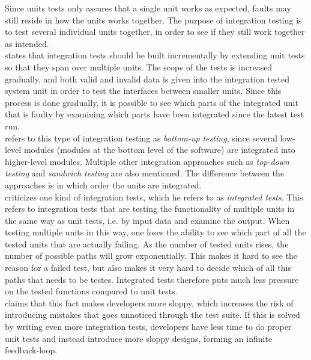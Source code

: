 Since units tests only assures that a single unit works as expected,
faults may still reside in how the units works together. The purpose of
integration testing is to test several individual units together, in
order to see if they still work together as intended.\\

\citet{book:adp} states that integration tests should be built
incrementally by extending unit tests so that they span over multiple
units. The scope of the tests is increased gradually, and both valid and
invalid data is given into the integration tested system unit in order
to test the interfaces between smaller units. Since this process is done
gradually, it is possible to see which parts of the integrated unit that
is faulty by examining which parts have been integrated since the latest
test run.\\

\citet{book:pfleeger} refers to this type of integration testing as
\emph{bottom-up testing}, since several low-level modules (modules at
the bottom level of the software) are integrated into higher-level
modules. Multiple other integration approaches such as \emph{top-down
testing} and \emph{sandwich testing} are also mentioned. The difference
between the approaches is in which order the units are integrated.\\

\citet{video:integrated_scam} criticizes one kind of integration tests,
which he refers to as \emph{integrated tests}. This refers to
integration tests that are testing the functionality of multiple units
in the same way as unit tests, i.e. by input data and examine the
output. When testing multiple units in this way, one loses the ability
to see which part of all the tested units that are actually failing. As
the number of tested units rises, the number of possible paths will grow
exponentially. This makes it hard to see the reason for a failed test,
but also makes it very hard to decide which of all this paths that needs
to be testes. Integrated tests therefore puts much less pressure on the
tested functions compared to unit tests.\\

\citeauthor{video:integrated_scam} claims that this fact makes
developers more sloppy, which increases the risk of introducing mistakes
that goes unnoticed through the test suite. If this is solved by writing
even more integration tests, developers have less time to do proper unit
tests and instead introduce more sloppy designs, forming an infinite
feedback-loop.\\


